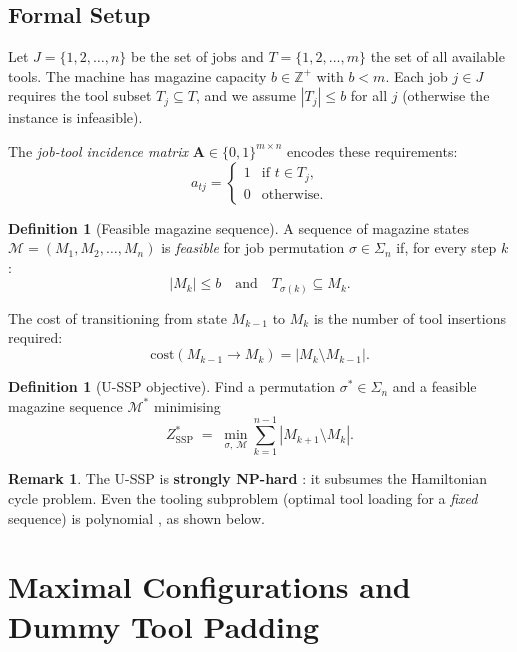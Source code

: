 \documentclass[11pt,a4paper]{article}
\theoremstyle{plain}
\theoremstyle{definition}
\newtheorem{definition}[theorem]{Definition}
\newtheorem{remark}[theorem]{Remark}
\begin{document}
\subsection{Formal Setup}

Let $J = \{1,2,\ldots,n\}$ be the set of jobs and $T = \{1,2,\ldots,m\}$ the set
of all available tools. The machine has magazine capacity $b \in \mathbb{Z}^+$
with $b < m$. Each job $j \in J$ requires the tool subset $T_j \subseteq T$, and
we assume $|T_j| \le b$ for all $j$ (otherwise the instance is infeasible).

The \emph{job-tool incidence matrix} $\mathbf{A} \in \{0,1\}^{m \times n}$ encodes
these requirements:
\[
  a_{tj} = \begin{cases} 1 & \text{if } t \in T_j, \\ 0 & \text{otherwise.} \end{cases}
\]

\begin{definition}[Feasible magazine sequence]
A sequence of magazine states $\mathcal{M} = (M_1, M_2, \ldots, M_n)$ is
\emph{feasible} for job permutation $\sigma \in \Sigma_n$ if, for every step $k$:
\[
  |M_k| \le b \quad \text{and} \quad T_{\sigma(k)} \subseteq M_k.
\]
\end{definition}

The cost of transitioning from state $M_{k-1}$ to $M_k$ is the number of
tool insertions required:
\[
  \mathrm{cost}(M_{k-1} \to M_k) = |M_k \setminus M_{k-1}|.
\]

\begin{definition}[U-SSP objective]
Find a permutation $\sigma^* \in \Sigma_n$ and a feasible magazine sequence
$\mathcal{M}^*$ minimising
\[
  Z_{\mathrm{SSP}}^* \;=\; \min_{\sigma,\,\mathcal{M}} \sum_{k=1}^{n-1} |M_{k+1} \setminus M_k|.
\]
\end{definition}

\begin{remark}
The U-SSP is \textbf{strongly NP-hard} \cite{Crama1994}: it subsumes the Hamiltonian
cycle problem. Even the tooling subproblem (optimal tool loading for a \emph{fixed}
sequence) is polynomial \cite{Tang1988}, as shown below.
\end{remark}

\section{Maximal Configurations and Dummy Tool Padding}
\label{sec:maximal}
\end{document}
